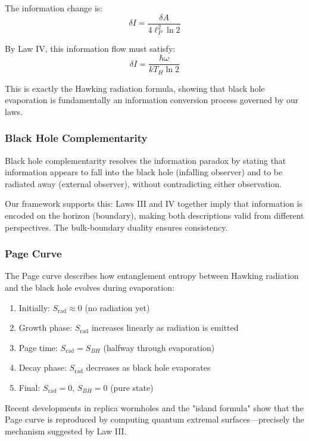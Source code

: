 \documentclass[11pt,a4paper]{article}
\theoremstyle{plain}
\theoremstyle{definition}
\theoremstyle{remark}
\begin{document}
The information change is:
\begin{equation}
\delta I = \frac{\delta A}{4\ell_P^2\ln 2}
\end{equation}

By Law IV, this information flow must satisfy:
\begin{equation}
\delta I = \frac{\hbar\omega}{kT_H\ln 2}
\end{equation}

This is exactly the Hawking radiation formula, showing that black hole evaporation is fundamentally an information conversion process governed by our laws.

\subsubsection{Black Hole Complementarity}

Black hole complementarity resolves the information paradox by stating that information appears to fall into the black hole (infalling observer) and to be radiated away (external observer), without contradicting either observation.

Our framework supports this: Laws III and IV together imply that information is encoded on the horizon (boundary), making both descriptions valid from different perspectives. The bulk-boundary duality ensures consistency.

\subsubsection{Page Curve}

The Page curve describes how entanglement entropy between Hawking radiation and the black hole evolves during evaporation:

\begin{enumerate}[leftmargin=*]
\item Initially: $S_{\text{rad}} \approx 0$ (no radiation yet)
\item Growth phase: $S_{\text{rad}}$ increases linearly as radiation is emitted
\item Page time: $S_{\text{rad}} = S_{BH}$ (halfway through evaporation)
\item Decay phase: $S_{\text{rad}}$ decreases as black hole evaporates
\item Final: $S_{\text{rad}} = 0$, $S_{BH} = 0$ (pure state)
\end{enumerate}

Recent developments in replica wormholes and the "island formula" show that the Page curve is reproduced by computing quantum extremal surfaces—precisely the mechanism suggested by Law III.
\end{document}
